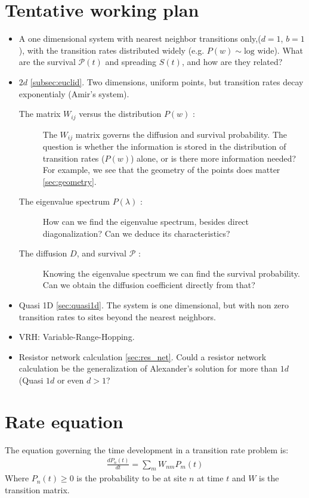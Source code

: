 \documentclass[onecolumn,fleqn]{revtex4}
\begin{document}
\section{Tentative working plan}
\begin{itemize}
    \item A one dimensional system with nearest neighbor transitions only,($d=1$, $b=1$), with the transition rates distributed widely (e.g. $P(w) \sim \textrm{log wide}$). What are the survival $\mathcal{P}(t)$ and spreading $S(t)$, and how are they related?
    \item $2d$ \ref{subsec:euclid}. Two dimensions, uniform points, but transition rates decay exponentialy (Amir's system). 
        \begin{description}
        \item[The matrix $W_{ij}$ versus the distribution $P(w)$ : ] The $W_{ij}$ matrix governs the diffusion and survival probability. The question is whether the information is stored in the distribution of transition rates ($P(w)$) alone, or is there more information needed? For example, we see that the geometry of the points does matter \ref{sec:geometry}.
        \item[The eigenvalue spectrum $P(\lambda)$ : ] How can we find the eigenvalue spectrum, besides direct diagonalization? Can we deduce its characteristics?
        \item[The diffusion $D$, and survival $\mathcal{P}$ : ] Knowing the eigenvalue spectrum we can find the survival probability. Can we obtain the diffusion coefficient directly from that? 
        \end{description}
    \item Quasi 1D \ref{sec:quasi1d}. The system is one dimensional, but with non zero transition rates to sites beyond the nearest neighbors.
    \item VRH: Variable-Range-Hopping. 
    \item Resistor network calculation \ref{sec:res_net}. Could a resistor network calculation be the generalization of Alexander's solution for more than $1d$ (Quasi $1d$ or even $d>1$?

\end{itemize}

\section{Rate equation}
The equation governing the time development in a transition rate problem is:
\begin{align}
\frac{dP_n(t)}{dt} = \sum_m W_{nm}P_m(t)
\end{align}
Where $P_n(t) \ge 0$ is the probability to be at site $n$ at time $t$ and $W$ is the transition matrix.
\end{document}
